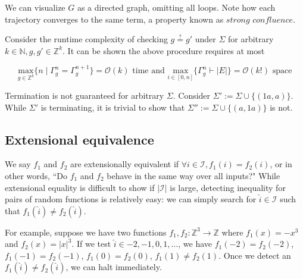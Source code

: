 \documentclass[11pt]{article}
\begin{document}
    \noindent We can visualize $G$ as a directed graph, omitting all loops. Note how each trajectory converges to the same term, a property known as $\textit{strong confluence}$.

    \hspace{12pt}


    \noindent Consider the runtime complexity of checking $g\overset{?}{=}g'$ under $\Sigma$ for arbitrary $k \in \mathbb{N}, g, g' \in \mathbb{Z}^k$. It can be shown the above procedure requires at most

    $$\underset{g \in \mathbb{Z}^k}{\text{max}}\{n \mid \Gamma_g^n = \Gamma_g^{n+1}\} = \mathcal{O}(k) \text{ time and } \underset{i \in [0, n]}{\text{max}}\{ \Gamma_g^n \vdash |E| \} = \mathcal{O}(k!) \text{ space}$$

    \noindent Termination is not guaranteed for arbitrary $\Sigma$. Consider $\Sigma' := \Sigma \cup \{(1a, a)\}$. While $\Sigma'$ is terminating, it is trivial to show that $\Sigma'':=\Sigma \cup \{(a, 1a)\}$ is not.


    \subsection{Extensional equivalence}\label{subsec:extensional-equivalence}

    We say $f_1$ and $f_2$ are extensionally equivalent if $\forall i \in \mathcal{I}, f_1(i)=f_2(i)$, or in other words, ``Do $f_1$ and $f_2$ behave in the same way over all inputs?" While extensional equality is difficult to show if $|\mathcal{I}|$ is large, detecting inequality for pairs of random functions is relatively easy: we can simply search for $\hat i \in \mathcal{I}$ such that $f_1(\hat i) \neq f_2(\hat i)$.


    For example, suppose we have two functions $f_1, f_2: \mathbb{Z}^3 \rightarrow \mathbb{Z}$ where $f_1(x)=-x^3$ and $f_2(x)=|x|^3$. If we test $\hat i \in {-2, -1, 0, 1, \ldots}$, we have $f_1(-2)=f_2(-2)$, $f_1(-1)=f_2(-1)$, $f_1(0)=f_2(0)$, $f_1(1) \neq f_2(1)$. Once we detect an $f_1(\hat i) \neq f_2(\hat i)$, we can halt immediately.
\end{document}
